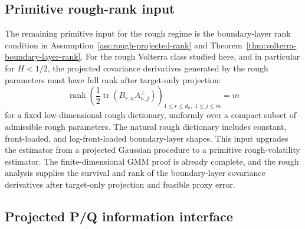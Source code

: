 \documentclass[11pt,a4paper]{amsart}
\theoremstyle{plain}
\theoremstyle{definition}
\theoremstyle{remark}
\DeclareMathOperator{\tr}{tr}
\DeclareMathOperator{\rank}{rank}
\begin{document}
\subsection{Primitive rough-rank input}

The remaining primitive input for the rough regime is the boundary-layer rank condition in
Assumption~\ref{ass:rough-projected-rank} and Theorem~\ref{thm:volterra-boundary-layer-rank}.  For
the rough Volterra class studied here, and in particular for \(H<1/2\), the projected covariance
derivatives generated by the rough parameters must have full rank after target-only projection:
\[
        \rank
        \left(
        \frac12\tr(B_{r,n}A_{n,j}^{\perp})
        \right)_{1\le r\le d_n,\;1\le j\le m}
        =
        m
\]
for a fixed low-dimensional rough dictionary, uniformly over a compact subset of admissible rough
parameters.  The natural rough dictionary includes constant, front-loaded, and
log-front-loaded boundary-layer shapes.  This input upgrades the estimator from a
projected Gaussian procedure to a primitive rough-volatility estimator.  The finite-dimensional GMM
proof is already complete, and the rough analysis supplies the survival and rank of the
boundary-layer covariance derivatives after target-only projection and feasible proxy error.

\subsection{Projected P/Q information interface}\label{subsec:operational-pq}
\end{document}
